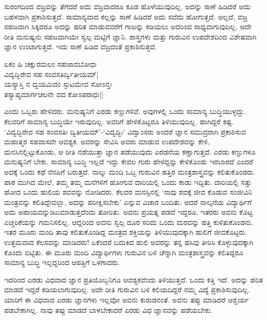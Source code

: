 ಸುರಂಗದಿಂದ ವಜ್ರವನ್ನು ತೆಗೆದರೆ ಅದು ವಜ್ರವಾದರೂ ಕೂಡ ಹೊಳೆಯುವುದಿಲ್ಲ. ಅದನ್ನು ಸಾಣೆ ಹಿಡಿದರೆ ಅದು ಬಹಳವಾಗಿ ಪ್ರಕಾಶಿಸುತ್ತದೆ. 
ಸಾಮಾನ್ಯವಾದ ಕಲ್ಲನ್ನು ಸಾಣೆ ಹಿಡಿದರೆ ಅದು ಸವೆದು ಹೋಗುತ್ತದೆ. ಅಲ್ಲದೆ, ವಜ್ರ ಸಹಜವಾಗಿ ಸಿಕ್ಕಿದರೂ ಅದನ್ನು ಹರಿತ ಮಾಡುವವರೆಗೆ ಗಾಜನ್ನು 
ಕಡಿಯಲು ಅದರಿಂದ ಸಾಧ್ಯವಾಗುವುದಿಲ್ಲ. ಅದೇ ರೀತಿ ಮನುಷ್ಯನು ಸಹಜವಾಗಿಯೇ ಸ್ವಲ್ಪ ಮಟ್ಟಿಗೆ ಜ್ಞಾನಿ. ಶಾಸ್ತ್ರಗಳು ಮತ್ತು ಗುರುವಿನ 
ಉಪದೇಶದಿಂದ ವಿಶೇಷವಾಗಿ ಜ್ಞಾನ ಉಂಟಾಗುತ್ತದೆ. ಇದು ಸಾಣೆ ಹಿಡಿದ ವಜ್ರದಂತೆ ಪ್ರಕಾಶಿಸುತ್ತದೆ.

\begin{shloka}
ಏಕಂ ಹಿ ಚಕ್ಷುರಮಲಂ ಸಹಜಾವಬೋಧಃ\\
ವಿದ್ವದ್ಭಿರೇವ ಸಹ ಸಂವಸತಿರ್ದ್ವಿತೀಯಮ್|\\
ಯಸ್ಯಾಸ್ತಿ ನ ದ್ವಯಮಿದಂ ಸ್ಫುಟಮೇವ ಸೋಽನ್ತಃ\\
ತಸ್ಯಾಪ್ಯಮಾರ್ಗಚಲನೇ ವದ ಕೋಽಪರಾಧಃ||
\end{shloka}

ಎಂದು ಒಬ್ಬರು ಹೇಳಿದರು. ಮನುಷ್ಯನಿಗೆ ಎರಡು ಕಣ್ಣುಗಳಿವೆ. ಅವುಗಳಲ್ಲಿ ಒಂದು ಸಾಮಾನ್ಯ ಬುದ್ಧಿಯುಳ್ಳದ್ದು. ಕೆಲವರಿಗೆ ಸಾಮಾನ್ಯ ಬುದ್ಧಿಯೇ 
ಇರುವುದಿಲ್ಲ. ಅವರಿಗೆ ಹೇಳಿಕೊಟ್ಟರೂ ತಿಳಿಯುವುದಿಲ್ಲ. ಹಾಗಿದ್ದರೆ ಕಷ್ಟ. `ವಿದ್ವದ್ಭಿರೇವ ಸಹ ಸಂವಸತಿಃ ದ್ವಿತೀಯಮ್'-`ವಿದ್ವದ್ಭಿಃ' ವಿದ್ವಾಂಸರು ಅಂದರೆ ಜ್ಞಾನ 
ಸಮುದ್ರರಾಗಿ ಪ್ರಕಾಶಿಸುವ ಮಹಾತ್ಮರ ಸಹವಾಸವೇ ಆವಶ್ಯಕ. ಅವರನ್ನು ಸೇವಿಸಿ ಅವರು ಮಾಡುವ ಉಪದೇಶವನ್ನು ಕೇಳಿ, ಮನಸಿನಲ್ಲಿಟ್ಟುಕೊಂಡು, ಆ 
ರೀತಿ ನಡೆಯುತ್ತಾ ಜ್ಞಾನ ಪಡೆಯುವುದು ಎರಡನೆಯ ಕಣ್ಣಾಗುತ್ತದೆ. ಎರಡು ಕಣ್ಣುಗಳೂ ಮನುಷ್ಯನಿಗೆ ಬೇಕು. ಸಾಮಾನ್ಯ ಬುದ್ಧಿ ಇಲ್ಲದೆ 
ಇದ್ದು ಕೇವಲ ಗುರು ಹೇಳಿದ್ದನ್ನು ಕೇಳಿಕೊಂಡು ಇರಬಾರದೆ ಎಂದರೆ ಅದಕ್ಕೆ ಒಂದು ಕಥೆ ನೆನಪಿಗೆ ಬರುತ್ತದೆ. ನಾಲ್ಕು ಮಂದಿ ಒಬ್ಬ ಗುರುವಿನ 
ಹತ್ತಿರ ಮಂತ್ರಶಾಸ್ತ್ರವನ್ನು ಕಲಿತುಕೊಂಡರು. ಪಾಠ ಮುಗಿದ ಮೇಲೆ, ತಮ್ಮ ತಮ್ಮ ಮನೆಗಳಿಗೆ ಹೋಗುವ ದಾರಿಯಲ್ಲಿ ಒಂದು ಕಾಡು 
ಇದ್ದಿತು. ದಾರಿಯಲ್ಲಿ ಸತ್ತು ಹೋದ ಒಂದು ಹುಲಿಯ ಶವವನ್ನು ನೋಡಿದರು. ಕೆಲವರ ಮನಸ್ಸಿನಲ್ಲಿ `ನಾವು ಶವಕ್ಕೆ ಜೀವ ಕೊಡುವ ಸಂಜೀವಿನಿ 
ಮಂತ್ರವನ್ನು ಕಲಿತಿದ್ದೇವಲ್ಲಾ, ಅದನ್ನು ಪರೀಕ್ಷಿಸಬೇಕು' ಎನ್ನುವ ವಿಚಾರ ಬಂದಿತು. ಆದರೆ ನಾಲ್ಕನೆಯ ವಿದ್ಯಾರ್ಥಿಗೆ ಅದು 
ಅಪಾಯವನ್ನುಂಟುಮಾಡುತ್ತದೆಂದು ತೋರಿತು. ಅವನು ಪ್ರಯತ್ನ ಪಡದೆ ಇದ್ದರೂ, ಇತರರು ಅವನು ಕೊಟ್ಟ ಎಚ್ಚರಿಕೆಯನ್ನು ಗಮನಿಸಲಿಲ್ಲ. ಆದ್ದರಿಂದ ಅವನು ಸ್ವಲ್ಪ ದೂರ ಸರಿದು ಒಂದು ಮರವನ್ನು ಹತ್ತಿ ಕುಳಿತುಕೊಂಡನು. ಇತರ ಮೂರು ಮಂದಿ ತಾವು ಕಲಿತುಕೊಂಡಿದ್ದ ಮಂತ್ರದ ಶಕ್ತಿಯನ್ನು ತಿಳಿಯುವುದಕ್ಕಾಗಿ ಹುಲಿಗೆ ಜೀವಕೊಟ್ಟರು. ಉತ್ತಮವಾದ ಕೆಲಸವನ್ನು ಮಾಡಿದರು! ಏಕೆಂದರೆ ಬದುಕಿದ ಹುಲಿ ಅವರನ್ನು ತನ್ನ ಹಸಿವು ತೀರಿಸಿ ಕೊಳ್ಳುವುದಕ್ಕಾಗಿ ಕೊಂದು ಬಿಟ್ಟಿತು. ಈ ಮೂರು ಮಂದಿ ವಿದ್ಯಾರ್ಥಿಗಳು ಗುರುವಿನ ಬಳಿ ಚೆನ್ನಾಗಿ ಮಂತ್ರಶಾಸ್ತ್ರವನ್ನು ಕಲಿತಿದ್ದರೂ ಸಾಮಾನ್ಯ ಬುದ್ಧಿ ಇಲ್ಲದ್ದರಿಂದ ಆಪತ್ತಿಗೆ ಒಳಗಾದರು. 

ಇದರಿಂದ ಎರಡು ವಿಧವಾದ ಜ್ಞಾನ ಪ್ರತಿಯೊಬ್ಬನಿಗೂ ಆವಶ್ಯಕವೆಂದು ತಿಳಿಯುತ್ತದೆ. ಒಂದು ಕತ್ತಿ ಇದೆ. ಅದನ್ನು ಹರಿತ ಮಾಡದೆ ಇದ್ದರೆ 
ಕಡಿಯಲಾಗುವುದಿಲ್ಲ. ಅದೇ ರೀತಿ ಗುರುವಿನ ಬಳಿ ಕಲಿಯದಿದ್ದರೆ ನಮ್ಮ ವಿದ್ಯೆ ಪ್ರಕಾಶಿಸುವುದಿಲ್ಲ. ಯಾರಿಗೆ ಈ ವಿಧವಾದ ಎರಡು ಜ್ಞಾನಗಳು 
ಇಲ್ಲವೋ ಅವನು ಕುರುಡನಂತೆ. ಅವನು ತಪ್ಪು ಮಾಡಿದರೆ ಆಶ್ಚರ್ಯ ಪಡಬೇಕಾಗಿಲ್ಲ. ನಾವು ತಪ್ಪು ಮಾಡದೆ ಬಾಳಬೇಕಾದರೆ ಎರಡು ವಿಧ ಜ್ಞಾನವನ್ನು ಪಡೆಯಬೇಕು.

